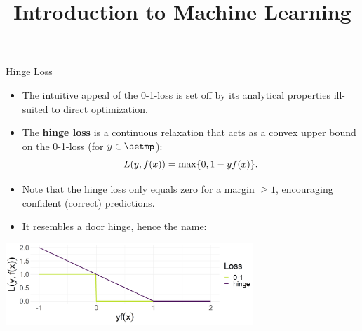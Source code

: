 





\newcommand{\titlefigure}{figure/plot_loss_overview_classif.png}
\newcommand{\learninggoals}{
  \item Know the (squared) hinge loss
  \item Know the $L2$ loss defined on scores
  \item Know the exponential loss
  \item Know the AUC loss 
}

\title{Introduction to Machine Learning}
\date{}





\begin{vbframe}{Hinge Loss}

\begin{itemize}
  \item The intuitive appeal of the 0-1-loss is set off by its analytical
  properties ill-suited to direct optimization.
  \item The \textbf{hinge loss} is a continuous relaxation that acts as a convex 
  upper bound on the 0-1-loss (for $y \in \setmp$): 
  $$L(y, f(x)) = \max \{ 0, 1 - yf(x) \}.$$
  \item Note that the hinge loss only equals zero for a margin $\geq 1$, 
  encouraging confident (correct) predictions.
  \item It resembles a door hinge, hence the name:
\end{itemize}

\begin{center}
\includegraphics[width = 0.7\textwidth]{figure/plot_loss_hinge.png}
\end{center}

\end{vbframe}


